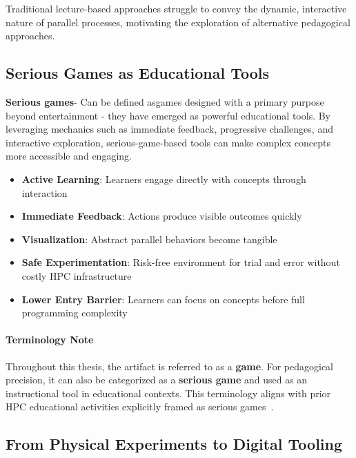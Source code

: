 Traditional lecture-based approaches struggle to convey the dynamic, interactive nature of parallel processes, motivating the exploration of alternative pedagogical approaches.

\subsection{Serious Games as Educational Tools}
\label{subsec:serious-games}

\textbf{Serious games}- Can be defined asgames designed with a primary purpose beyond entertainment - they have emerged as powerful educational tools. By leveraging mechanics such as immediate feedback, progressive challenges, and interactive exploration, serious-game-based tools can make complex concepts more accessible and engaging.

\begin{itemize}
    \item \textbf{Active Learning}: Learners engage directly with concepts through interaction
    \item \textbf{Immediate Feedback}: Actions produce visible outcomes quickly
    \item \textbf{Visualization}: Abstract parallel behaviors become tangible
    \item \textbf{Safe Experimentation}: Risk-free environment for trial and error  without costly HPC infrastructure
    \item \textbf{Lower Entry Barrier}: Learners can focus on concepts before full programming complexity
\end{itemize}

\paragraph*{Terminology Note}
Throughout this thesis, the artifact is referred to as a \textbf{game}. For pedagogical precision, it can also be categorized as a \textbf{serious game} and used as an instructional tool in educational contexts.
This terminology aligns with prior HPC educational activities explicitly framed as serious games~\citep{mullen2021teaching}.

\subsection{From Physical Experiments to Digital Tooling}
\label{subsec:physical-experiments}

